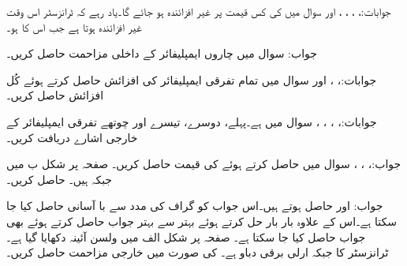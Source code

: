 جوابات:، ، ، ،  اور 
سوال  میں  کی کس قیمت پر  غیر افزائندہ ہو جائے گا۔یاد رہے کہ ٹرانزسٹر اس وقت غیر افزائندہ ہوتا ہے جب اس کا  ہو۔

جواب: 
سوال  میں چاروں ایمپلیفائر کے داخلی مزاحمت حاصل کریں۔

جوابات:، ،  اور 
سوال  میں  تمام تفرقی ایمپلیفائر کی افزائش حاصل کرتے ہوئے کُل افزائش  حاصل کریں۔

جوابات:، ، ، ، 
سوال  میں  ہے۔پہلے، دوسرے، تیسرے اور چوتھے تفرقی ایمپلیفائر کے خارجی اشارے دریافت کریں۔

جواب:، ، ، 
سوال   میں  حاصل کرتے ہوئے  کی قیمت حاصل کریں۔
صفحہ  پر شکل  ب میں  جبکہ  ہیں۔ حاصل کریں۔

جواب: اور   حاصل ہوتے ہیں۔اس جواب کو گراف کی مدد سے با آسانی حاصل کیا جا سکتا ہے۔اس کے علاوہ بار بار حل کرتے ہوئے بہتر سے بہتر جواب حاصل کرتے ہوئے بھی جواب حاصل کیا جا سکتا ہے۔ 
صفحہ  پر شکل  الف میں ولسن آئینہ دکھایا گیا ہے۔ٹرانزسٹر کا  جبکہ ارلی برقی دباو  ہے۔ کی صورت میں  خارجی مزاحمت  حاصل کریں۔

